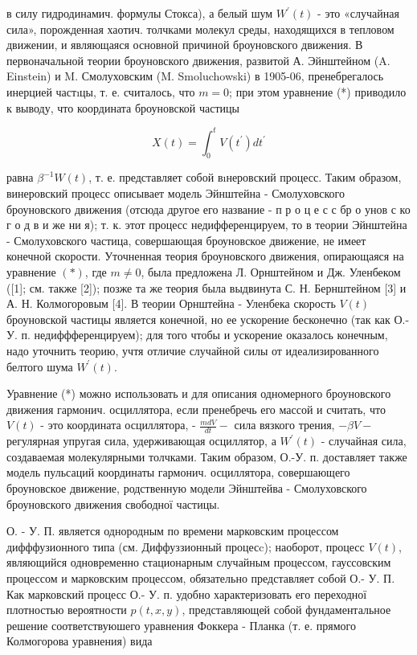 \documentclass[10pt]{article}
\begin{document}
в силу гидродинамич. формулы Стокса), а белый шум $W^{\prime}(t)$ - это «случайная сила», порожденная хаотич. толчками молекул среды, находящихся в тепловом движении, и являющаяся основной причиной броуновского движения. В первоначальной теории броуновского движения, развитой А. Эйнштейном (A. Einstein) и M. Смолуховским (M. Smoluchowski) в 1905-06, пренебрегалось инерцией частıцы, т. е. считалось, что $m=0$; при этом уравнение (*) приводило к выводу, что координата броуновской частицы

\[
X(t)=\int_{0}^{t} V\left(t^{\prime}\right) d t^{\prime}
\]

равна $\beta^{-1} W(t)$, т. е. представляет собой вıнеровский процесс. Таким образом, винеровский процесс описывает модель Эйнштейна - Смолуховского броуновского движения (отсюда другое его название - п р о ц е с с бр о унов с ко г о д в и же ни я); т. к. этот процесс недифференцируем, то в теории Эйнштейна - Смолуховского частица, совершающая броуновское движение, не имеет конечной скорости. Уточненная теория броуновского движения, опирающаяся на уравнение $(*)$, где $m \neq 0$, была предложена Л. Орнштейном и Дж. Уленбеком ([1]; см. также [2]); позже та же теория была выдвинута С. Н. Бернштейном [3] и А. Н. Колмогоровым [4]. В теории Орнштейна - Уленбека скорость $V(t)$ броуновской частицы является конечной, но ее ускорение бесконечно (так как О.-У. п. недиффференцируем); для того чтобы и ускорение оказалось конечным, надо уточнить теорию, учтя отличие случайной силы от идеализированного белтого шума $W^{\prime}(t)$.

Уравнение (*) можно использовать и для описания одномерного броуновского движения гармонич. осциллятора, если пренебречь его массой и считать, что $V(t)$ - это координата осциллятора, - $\frac{m d V}{d t}-$ сила вязкого трения, $-\beta V-$ регулярная упругая сила, удерживающая осциллятор, а $W^{\prime}(t)$ - случайная сила, создаваемая молекулярными толчками. Таким образом, О.-У. п. доставляет также модель пульсаций координаты гармонич. осциллятора, совершающего броуновское движение, родственную модели Эйнштейва - Смолуховского броуновского движения свободної частицы.

О. - У. П. является однородным по времени марковским процессом дифффузионного типа (см. Диффуззионный процесc); наоборот, процесс $V(t)$, являющийся одновременно стационарным случайным процессом, гауссовским процессом и марковским процессом, обязательно представляет собой О.- У. П. Как марковский процесс О.- У. п. удобно характеризовать его переходної плотностью вероятности $p(t, x, y)$, представляющей собой фундаментальное решение соответствуюшего уравнения Фоккера - Планка (т. е. прямого Колмогорова уравнения) вида
\end{document}
